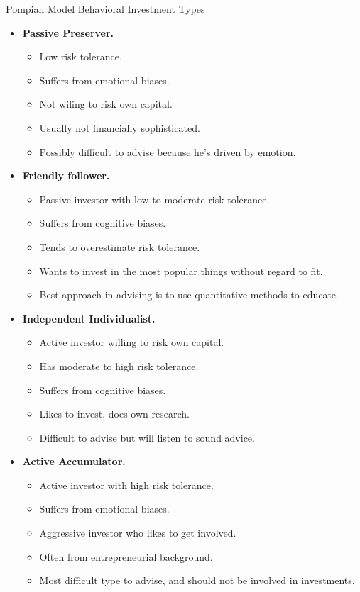\documentclass[../custom]{flashcards}
\newcommand{\studyArea}{Behavioral Finance}
\begin{document}
\begin{flashcard}[\studyArea]{Pompian Model Behavioral Investment Types}
    \begin{itemize}[nosep]
        \item \textbf{Passive Preserver.}
            \begin{itemize}[nosep]
                \item Low risk tolerance.
                \item Suffers from emotional biases.
                \item Not wiling to risk own capital.
                \item Usually not financially sophisticated.
                \item Possibly difficult to advise because he's driven by emotion.
            \end{itemize}
        \item \textbf{Friendly follower.}
            \begin{itemize}[nosep]
                \item Passive investor with low to moderate risk tolerance.
                \item Suffers from cognitive biases.
                \item Tends to overestimate risk tolerance.
                \item Wants to invest in the most popular things without regard to fit.
                \item Best approach in advising is to use quantitative methods to educate.
            \end{itemize}
        \item \textbf{Independent Individualist.}
            \begin{itemize}[nosep]
                \item Active investor willing to risk own capital.
                \item Has moderate to high risk tolerance.
                \item Suffers from cognitive biases.
                \item Likes to invest, does own research.
                \item Difficult to advise but will listen to sound advice.
            \end{itemize}
        \item \textbf{Active Accumulator.}
            \begin{itemize}[nosep]
                \item Active investor with high risk tolerance.
                \item Suffers from emotional biases. 
                \item Aggressive investor who likes to get involved.
                \item Often from entrepreneurial background.
                \item Most difficult type to advise, and should not be involved in investments.
            \end{itemize}
    \end{itemize}
\end{flashcard}
\end{document}
